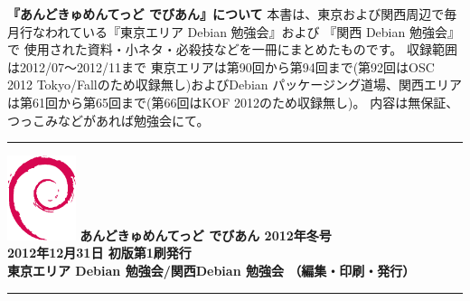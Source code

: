 \documentclass[mingoth,a4paper]{jsarticle}
\begin{document}
\printindex

\newpage
\thispagestyle{empty}\mbox{}

\newpage

\thispagestyle{empty}
{
\large
\begin{itembox}{\bf 『あんどきゅめんてっど でびあん』について}
本書は、東京および関西周辺で毎月行なわれている『東京エリア Debian 勉強会』および
『関西 Debian 勉強会』で
使用された資料・小ネタ・必殺技などを一冊にまとめたものです。
収録範囲は2012/07〜2012/11まで
東京エリアは第90回から第94回まで(第92回はOSC 2012 Tokyo/Fallのため収録無し)およびDebian パッケージング道場、関西エリアは第61回から第65回まで(第66回はKOF 2012のため収録無し)。
内容は無保証、つっこみなどがあれば勉強会にて。
\end{itembox}
}

\vspace*{13cm}
{\color{dancerlightblue}\rule{\hsize}{1mm}}
\vspace{2mm}
\includegraphics[width=2cm]{image200502/openlogo-nd.eps}
\noindent \Large \bf あんどきゅめんてっど でびあん 2012年冬号\\
\noindent \normalfont 2012年12月31日 \hspace{5mm}  初版第1刷発行\\
\noindent \normalfont 東京エリア Debian 勉強会/関西Debian 勉強会 （編集・印刷・発行）\\
{\color{dancerdarkblue}\rule{\hsize}{1mm}}
\end{document}
